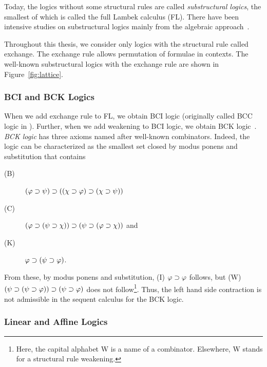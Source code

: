 Today, the logics without some structural rules are called \textit{substructural
logics}, the smallest of which is called the
full Lambek calculus (FL).  There have been intensive studies on
substructural logics mainly from the algebraic
approach~\cite{residuated}.

Throughout this thesis, we consider only logics with the structural rule
called exchange.
The exchange rule allows permutation of formulae in contexts.
The well-known substructural logics with the exchange rule are shown in
Figure~\ref{fig:lattice}.

\subsubsection{BCI and BCK Logics}

When we add exchange rule to FL, we obtain BCI logic (originally called
BCC logic in \citep{ono-komori-1985}).
Further, when we add weakening to BCI logic, we obtain BCK
logic~\citep{ono-komori-1985}.
\textit{BCK logic} has three axioms named after well-known
combinators.  Indeed, the logic can be characterized as the smallest set
closed by modus ponens and substitution that contains
\begin{description}
 \item[(B)] $(\varphi\supset\psi)\supset((\chi\supset\varphi)\supset(\chi\supset\psi))$
 \item[(C)] $(\varphi\supset(\psi\supset\chi))\supset(\psi\supset(\varphi\supset\chi))$ and
 \item[(K)] $\varphi\supset(\psi\supset\varphi)$\enspace.
\end{description}
From these, by modus ponens and substitution, (I) $\varphi\supset\varphi$
follows, but
(W) $(\psi\supset(\psi\supset\varphi))\supset(\psi\supset\varphi)$ does not
follow\footnote{Here, the capital alphabet W is a name of a combinator.
Elsewhere, W stands for a structural rule weakening.}.
Thus, the left hand side contraction is not admissible in the sequent
calculus for the BCK logic.

\subsubsection{Linear and Affine Logics}
\label{subsub:la-logics}

